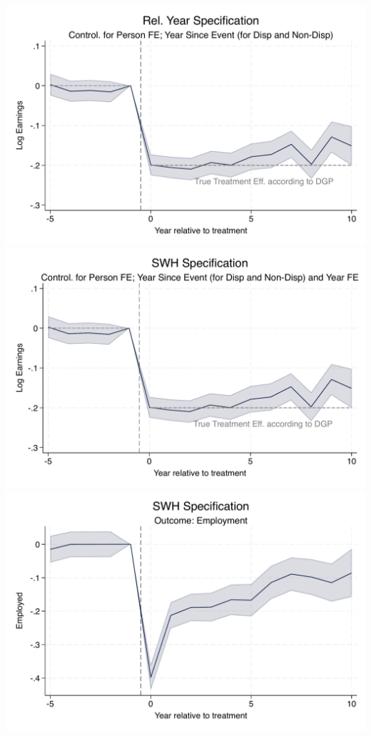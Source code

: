 \documentclass{article}
\begin{document}
\includegraphics[width = .9\textwidth]{Eventstudy/eventstudy_FE_RelYear.pdf} \\ 
\includegraphics[width = .9\textwidth]{Eventstudy/eventstudy_FE_Full.pdf} \\ 
\includegraphics[width = .9\textwidth]{Eventstudy/eventstudy_FE_Full_employed.pdf} \\ 
\end{document}
